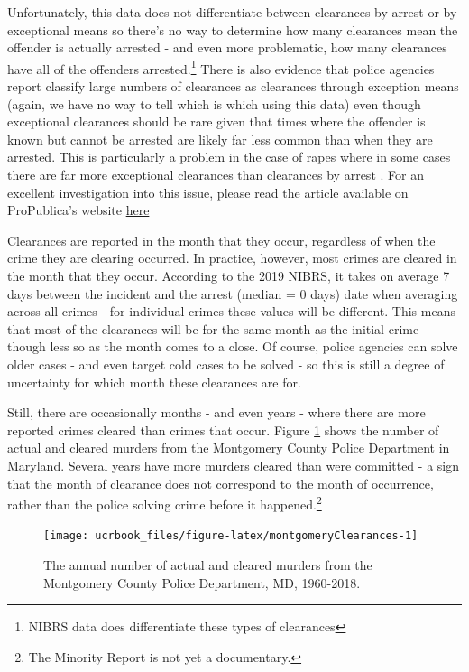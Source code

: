 \documentclass[
  12pt,
  openany]{book}
\begin{document}
Unfortunately, this data does not differentiate between clearances by arrest or by exceptional means so there's no way to determine how many clearances mean the offender is actually arrested - and even more problematic, how many clearances have all of the offenders arrested.\footnote{NIBRS data does differentiate these types of clearances} There is also evidence that police agencies report classify large numbers of clearances as clearances through exception means (again, we have no way to tell which is which using this data) even though exceptional clearances should be rare given that times where the offender is known but cannot be arrested are likely far less common than when they are arrested. This is particularly a problem in the case of rapes where in some cases there are far more exceptional clearances than clearances by arrest \citep{yeung2018comes}. For an excellent investigation into this issue, please read the \citet{yeung2018comes} article available on ProPublica's website \href{https://www.propublica.org/article/when-it-comes-to-rape-just-because-a-case-is-cleared-does-not-mean-solved}{here}

Clearances are reported in the month that they occur, regardless of when the crime they are clearing occurred. In practice, however, most crimes are cleared in the month that they occur. According to the 2019 NIBRS, it takes on average 7 days between the incident and the arrest (median = 0 days) date when averaging across all crimes - for individual crimes these values will be different. This means that most of the clearances will be for the same month as the initial crime - though less so as the month comes to a close. Of course, police agencies can solve older cases - and even target cold cases to be solved - so this is still a degree of uncertainty for which month these clearances are for.

Still, there are occasionally months - and even years - where there are more reported crimes cleared than crimes that occur. Figure \ref{fig:montgomeryClearances} shows the number of actual and cleared murders from the Montgomery County Police Department in Maryland. Several years have more murders cleared than were committed - a sign that the month of clearance does not correspond to the month of occurrence, rather than the police solving crime before it happened.\footnote{The Minority Report is not yet a documentary.}

\begin{figure}

{\centering \texttt{[image: ucrbook\_files/figure-latex/montgomeryClearances-1]} 

}

\caption{The annual number of actual and cleared murders from the Montgomery County Police Department, MD, 1960-2018.}\label{fig:montgomeryClearances}
\end{figure}
\end{document}
